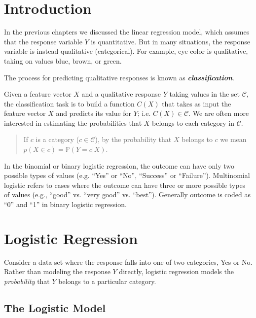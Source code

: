 \documentclass[]{book}
\begin{document}
\section{Introduction}\label{introduction-1}

In the previous chapters we discussed the linear regression model, which
assumes that the response variable \(Y\) is quantitative. But in many
situations, the response variable is instead qualitative (categorical).
For example, eye color is qualitative, taking on values blue, brown, or
green.

The process for predicting qualitative responses is known as
\textbf{\emph{classification}}.

Given a feature vector \(X\) and a qualitative response \(Y\) taking
values in the set \(\mathcal{C}\), the classification task is to build a
function \(C(X)\) that takes as input the feature vector \(X\) and
predicts its value for \(Y\); i.e. \(C(X) \in \mathcal{C}\). We are
often more interested in estimating the probabilities that \(X\) belongs
to each category in \(\mathcal{C}\).

\begin{quote}
If \(c\) is a category (\(c \in \mathcal{C}\)), by the probability that
\(X\) belongs to \(c\) we mean \(p(X \in c) = \mathbb{P}(Y=c|X)\).
\end{quote}

In the binomial or binary logistic regression, the outcome can have only
two possible types of values (e.g. ``Yes'' or ``No'', ``Success'' or
``Failure''). Multinomial logistic refers to cases where the outcome can
have three or more possible types of values (e.g., ``good'' vs. ``very
good'' vs. ``best''). Generally outcome is coded as ``0'' and ``1'' in
binary logistic regression.

\section{Logistic Regression}\label{logistic-regression-1}

Consider a data set where the response falls into one of two categories,
Yes or No. Rather than modeling the response \(Y\) directly, logistic
regression models the \emph{probability} that \(Y\) belongs to a
particular category.

\subsection{The Logistic Model}\label{the-logistic-model}
\end{document}
